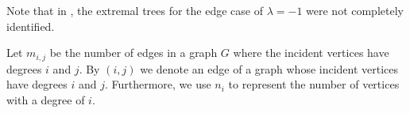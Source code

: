 \documentclass[preprint,12pt]{elsarticle}
\begin{document}
Note that in \cite{dehgardia2023}, the extremal trees for the edge case of $\lambda = -1$ were not completely identified. 


\label{S:1}

Let $m_{i,j}$ be the number of edges in a graph $G$ where the incident vertices have degrees $i$ and $j$.
By $(i,j)$ we denote an edge of a graph whose incident vertices have degrees $i$ and $j$.
Furthermore, we use $n_i$ to represent the number of vertices with a degree of $i$.







\end{document}
